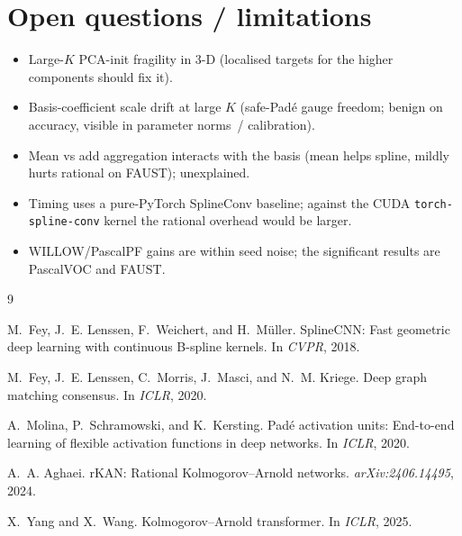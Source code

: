 \documentclass[11pt]{article}
\newcommand{\code}[1]{\texttt{#1}}
\begin{document}
\section{Open questions / limitations}
\label{sec:limitations}

\begin{itemize}
\item Large-$K$ PCA-init fragility in 3-D (localised targets for the higher
  components should fix it).
\item Basis-coefficient scale drift at large $K$ (safe-Pad\'e gauge freedom;
  benign on accuracy, visible in parameter norms~/ calibration).
\item Mean vs add aggregation interacts with the basis (mean helps spline,
  mildly hurts rational on FAUST); unexplained.
\item Timing uses a pure-PyTorch SplineConv baseline; against the CUDA
  \code{torch-spline-conv} kernel the rational overhead would be larger.
\item WILLOW/PascalPF gains are within seed noise; the significant results
  are PascalVOC and FAUST.
\end{itemize}

\begin{thebibliography}{9}

M.~Fey, J.~E. Lenssen, F.~Weichert, and H.~M\"uller.
\newblock SplineCNN: Fast geometric deep learning with continuous B-spline
  kernels.
\newblock In \emph{CVPR}, 2018.

M.~Fey, J.~E. Lenssen, C.~Morris, J.~Masci, and N.~M. Kriege.
\newblock Deep graph matching consensus.
\newblock In \emph{ICLR}, 2020.

A.~Molina, P.~Schramowski, and K.~Kersting.
\newblock Pad\'e activation units: End-to-end learning of flexible activation
  functions in deep networks.
\newblock In \emph{ICLR}, 2020.

A.~A. Aghaei.
\newblock rKAN: Rational Kolmogorov--Arnold networks.
\newblock \emph{arXiv:2406.14495}, 2024.

X.~Yang and X.~Wang.
\newblock Kolmogorov--Arnold transformer.
\newblock In \emph{ICLR}, 2025.

\end{thebibliography}
\end{document}
